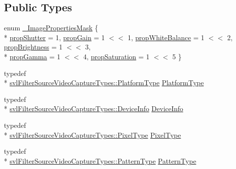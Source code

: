 \subsection*{Public Types}
\begin{DoxyCompactItemize}
\item 
enum \hyperlink{classsvl_filter_source_video_capture_a479413536f6b6d984c08c44b0cbd64f2}{\-\_\-\-Image\-Properties\-Mask} \{ \\*
\hyperlink{classsvl_filter_source_video_capture_a479413536f6b6d984c08c44b0cbd64f2a4d4abed08ff5a841c3cad808d18d88d1}{prop\-Shutter} = 1, 
\hyperlink{classsvl_filter_source_video_capture_a479413536f6b6d984c08c44b0cbd64f2a88da91bf4ae85481673925943068bc37}{prop\-Gain} = 1 $<$$<$ 1, 
\hyperlink{classsvl_filter_source_video_capture_a479413536f6b6d984c08c44b0cbd64f2aede12f2f91b1e017e4027f350ea8035b}{prop\-White\-Balance} = 1 $<$$<$ 2, 
\hyperlink{classsvl_filter_source_video_capture_a479413536f6b6d984c08c44b0cbd64f2ac3c2d9c1e70cc5b6bc1c76ed483cd7a0}{prop\-Brightness} = 1 $<$$<$ 3, 
\\*
\hyperlink{classsvl_filter_source_video_capture_a479413536f6b6d984c08c44b0cbd64f2a5084b58f2483c79dc12662bc03696ddf}{prop\-Gamma} = 1 $<$$<$ 4, 
\hyperlink{classsvl_filter_source_video_capture_a479413536f6b6d984c08c44b0cbd64f2afe5986680c0c4853df93e46902891b37}{prop\-Saturation} = 1 $<$$<$ 5
 \}
\item 
typedef \\*
\hyperlink{namespacesvl_filter_source_video_capture_types_aa8ef2b6d9a414a8970cc722eaa37b32b}{svl\-Filter\-Source\-Video\-Capture\-Types\-::\-Platform\-Type} \hyperlink{classsvl_filter_source_video_capture_a75f10dbd026c0ae70007a18758895ea0}{Platform\-Type}
\item 
typedef \\*
\hyperlink{classsvl_filter_source_video_capture_types_1_1_device_info}{svl\-Filter\-Source\-Video\-Capture\-Types\-::\-Device\-Info} \hyperlink{classsvl_filter_source_video_capture_ad656487fb2deec890dc39764152b8f8b}{Device\-Info}
\item 
typedef \\*
\hyperlink{namespacesvl_filter_source_video_capture_types_a6b2f5fb1010bb41e1fb7232f88fc515f}{svl\-Filter\-Source\-Video\-Capture\-Types\-::\-Pixel\-Type} \hyperlink{classsvl_filter_source_video_capture_a0d92a26e94ffd48535df5ab2ff330c90}{Pixel\-Type}
\item 
typedef \\*
\hyperlink{namespacesvl_filter_source_video_capture_types_a1c4eecd5680f271e0f58336666a69485}{svl\-Filter\-Source\-Video\-Capture\-Types\-::\-Pattern\-Type} \hyperlink{classsvl_filter_source_video_capture_a374a69b1d506cf982ba5ce45d5f84776}{Pattern\-Type}
$$
\end{DoxyCompactItemize}
